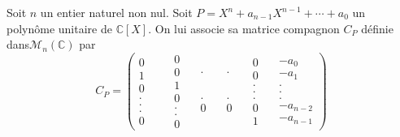 Soit $n$ un entier naturel non nul. Soit $P = X^n + a_{n - 1} X^{n - 1} +
\cdots + a_0$ un polyn{\^o}me unitaire de $\mathbb{C}[X]$. On lui associe sa
matrice compagnon $C_P$ d{\'e}finie dans$\mathcal{M}_n (\mathbb{C})$ par
\[ C_P = \left( \begin{array}{c}
     0\\
     1\\
     0\\
     .\\
     .\\
     .\\
     0
   \end{array} \begin{array}{c}
     \\
     
   \end{array} \quad \begin{array}{c}
     0\\
     0\\
     1\\
     0\\
     .\\
     .\\
     0
   \end{array} \quad  \begin{array}{c}
     .\\
     \\
     \\
     \\
     \\
     .\\
     0
   \end{array} \quad \begin{array}{c}
     .\\
     \\
     \\
     \\
     \\
     .\\
     0
   \end{array} \quad \begin{array}{l}
     0\\
     0\\
     .\\
     .\\
     .\\
     0\\
     1
   \end{array} \quad  \begin{array}{l}
     - a_0\\
     - a_1\\
     .\\
     .\\
     .\\
     - a_{n - 2}\\
     - a_{n - 1}
   \end{array} \right) \]




